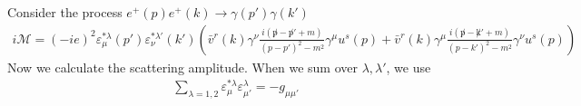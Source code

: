 
Consider the process $e^+(p)e^+(k)\rightarrow \gamma(p')\gamma(k')$
\begin{equation}
\begin{aligned}
i\mathcal{M} =(-ie)^2 \varepsilon^{*\lambda}_\mu(p') \varepsilon^{*\lambda'}_\nu(k') \left( \bar v^r(k)\gamma^\nu \frac{i({\not p}-{\not p}'+m)}{(p-p')^2-m^2} \gamma^\mu u^s(p) 
+
 \bar v^r(k)\gamma^\mu \frac{i({\not p}-{\not k}'+m)}{(p-k')^2-m^2} \gamma^\nu u^s(p) 
\right)
\end{aligned}
\end{equation}
Now we calculate the scattering amplitude. When we sum over $\lambda,\lambda'$, we use
\begin{equation}
\begin{aligned}
\sum_{\lambda=1,2}\varepsilon_\mu^{*\lambda} \varepsilon_{\mu'}^{\lambda}=-g_{\mu\mu'} 
\end{aligned}
\end{equation}

